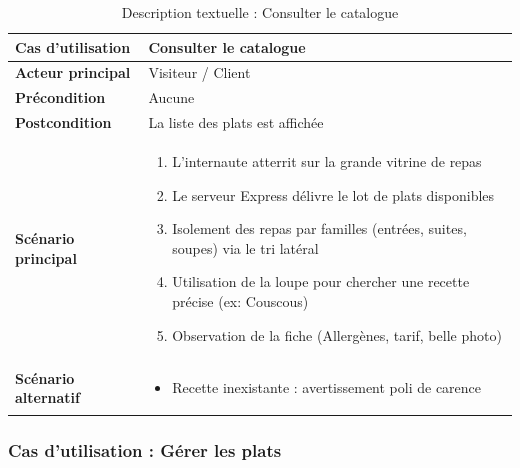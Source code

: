 \begin{table}[H]
    \centering
    \caption{Description textuelle : Consulter le catalogue}
    \label{tab:desc_consulter_catalogue}
    \renewcommand{\arraystretch}{1.3}
    \begin{tabular}{|p{4cm}|p{8.5cm}|}
        \hline
        \textbf{Cas d'utilisation} & Consulter le catalogue \\
        \hline
        \textbf{Acteur principal} & Visiteur / Client \\
        \hline
        \textbf{Précondition} & Aucune \\
        \hline
        \textbf{Postcondition} & La liste des plats est affichée \\
        \hline
        \textbf{Scénario principal} &
        \begin{enumerate}
            \item L'internaute atterrit sur la grande vitrine de repas
            \item Le serveur Express délivre le lot de plats disponibles
            \item Isolement des repas par familles (entrées, suites, soupes) via le tri latéral
            \item Utilisation de la loupe pour chercher une recette précise (ex: Couscous)
            \item Observation de la fiche (Allergènes, tarif, belle photo)
        \end{enumerate} \\
        \hline
        \textbf{Scénario alternatif} &
        \begin{itemize}
            \item[4a.] Recette inexistante : avertissement poli de carence
        \end{itemize} \\
        \hline
    \end{tabular}
\end{table}

\subsubsection{Cas d'utilisation : Gérer les plats}

